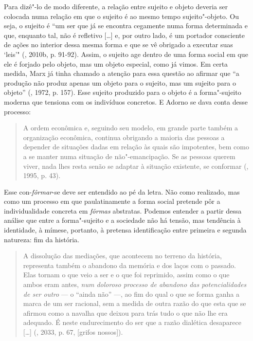 Para dizê"-lo de modo diferente, a relação entre sujeito e objeto deveria ser
colocada numa relação em que o sujeito é ao mesmo tempo sujeito"-objeto.
Ou seja, o sujeito é ``um ser que já se encontra cegamente numa forma
determinada e que, enquanto tal, não é refletivo [\ldots{}] e, por outro
lado, é um portador consciente de ações no interior dessa mesma forma e
que se vê obrigado a executar suas `leis'" (, 2010b, p. 91-92).
Assim, o sujeito age dentro de uma forma social em que ele é forjado
pelo objeto, mas um objeto especial, como já vimos. Em certa medida,
Marx já tinha chamado a atenção para essa questão ao afirmar que ``a
produção não produz apenas um objeto para o sujeito, mas um sujeito para
o objeto'' (, 1972, p. 157). Esse sujeito produzido para o objeto é
a forma"-sujeito moderna que tensiona com os indivíduos concretos. E
Adorno se dava conta desse processo:

\begin{quote}
A ordem econômica e, seguindo seu modelo, em grande parte também a
organização econômica, continua obrigando a maioria das pessoas a
depender de situações dadas em relação às quais são impotentes, bem como
a se manter numa situação de não"-emancipação. Se as pessoas querem
viver, nada lhes resta senão se adaptar à situação existente, se
conformar (, 1995, p. 43).
\end{quote}

Esse con-\emph{fôrmar}-se deve ser entendido ao pé da letra. Não como
realizado, mas como um processo em que paulatinamente a forma social
pretende pôr a individualidade concreta em \emph{fôrmas} abstratas.
Podemos entender a partir dessa análise que entre a forma"-sujeito e a
sociedade não há tensão, mas tendência à identidade, à mímese, portanto,
à pretensa identificação entre primeira e segunda natureza: fim da
história.

\begin{quote}
A dissolução das mediações, que acontecem no terreno da história,
representa também o abandono da memória e dos laços com o passado. Elas
tornam o que veio a ser e o que foi reprimido, assim como o que ambos
eram antes, \emph{num doloroso processo de abandono das potencialidades
de ser outro} --- o ``ainda não'' ---, ao fim do qual o que se forma ganha
a marca de um ser racional, sem a medida de outra razão do que esta que
se afirmou como a navalha que deixou para trás tudo o que não lhe era
adequado. É neste endurecimento do ser que a razão dialética desaparece
[\ldots{}] (, 2033, p. 67, [grifos nossos]).
\end{quote}

